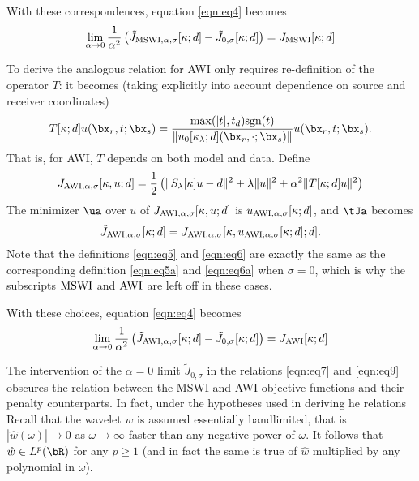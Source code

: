 With these correspondences, equation \ref{eqn:eq4} becomes
\begin{equation}
  \label{eqn:eq7}
  \lim_{\alpha \rightarrow 0}
  \frac{1}{\alpha^2}\left(\tilde{J}_{{\rm MSWI},\alpha,\sigma}[\kappa;d]-\tilde{J}_{0,\sigma}[\kappa;d]\right)=
  J_{\rm MSWI}[\kappa;d]
\end{equation}

To derive the analogous relation for AWI only requires re-definition
of the operator $T$: it becomes (taking explicitly into account
dependence on source and receiver coordinates)
\begin{equation}
  \label{eqn:eq8}
  T[\kappa;d] u(\bx_r,t;\bx_s) = \frac{\max(|t|, t_d)
    \mbox{sgn}(t)}{\|u_0[\kappa_{\lambda};d](\bx_r,\cdot;\bx_s)\|}
  u(\bx_r,t;\bx_s).
\end{equation}
That is, for AWI, $T$ depends on both model and data. Define
\begin{equation}
  \label{eqn:eq5a}
   J_{{\rm AWI},\alpha,\sigma}[\kappa,u;d] = \frac{1}{2}\left(\|S_{\lambda}[\kappa]u-d\|^2 +
   \lambda\|u\|^2 + \alpha^2\|T[\kappa;d]u\|^2\right)
 \end{equation}
The minimizer $\ua$ over $u$ of $ J_{{\rm AWI}, \alpha,\sigma}[\kappa,u;d]$ is
$u_{{\rm AWI},\alpha,\sigma}[\kappa;d]$, and $\tJa$ becomes
\begin{equation}
  \label{eqn:eq6a}
  \tilde{J}_{{\rm AWI},\alpha,\sigma}[\kappa;d] =
  J_{{\rm AWI};\alpha,\sigma}[\kappa,u_{{\rm AWI};\alpha,\sigma}[\kappa;d];d].
\end{equation}
Note that the definitions \ref{eqn:eq5} and \ref{eqn:eq6} are exactly
the same as the corresponding definition \ref{eqn:eq5a} and
\ref{eqn:eq6a} when $\sigma=0$, which is why the subscripts ${\rm
  MSWI}$ and ${\rm AWI}$ are left off in these cases.

With these choices, equation \ref{eqn:eq4} becomes 
\begin{equation}
  \label{eqn:eq9}
  \lim_{\alpha \rightarrow 0}
  \frac{1}{\alpha^2}\left(\tilde{J}_{{\rm AWI},\alpha,\sigma}[\kappa;d]-\tilde{J}_{0,\sigma}[\kappa;d]\right)=
  J_{\rm AWI}[\kappa;d]
\end{equation}

The intervention of the $\alpha=0$ limit $\tilde{J}_{0,\sigma}$ in the
relations \ref{eqn:eq7} and \ref{eqn:eq9} obscures the relation
between the MSWI and AWI objective functions and their penalty
counterparts. In fact, under the hypotheses used in deriving he
relations 
Recall that the wavelet $w$ is assumed essentially bandlimited, that is
$|\hat{w}(\omega)| \rightarrow 0$ as $\omega \rightarrow \infty$
faster than any negative power of $\omega$. It follows that $\hat{w}
\in L^p(\bR)$ for any $p \ge 1$ (and in fact the same is true of
$\hat{w}$ multiplied by any polynomial in $\omega$). 

